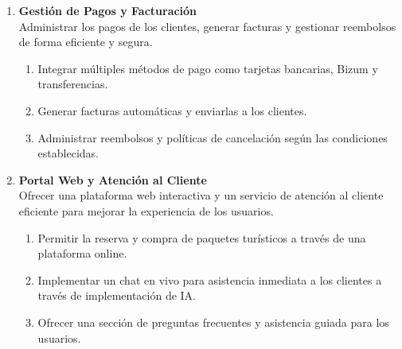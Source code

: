 \begin{enumerate}[label=\textcolor{red}{RF-\arabic*.}]
    \item \textbf{Gestión de Pagos y Facturación}\\
    Administrar los pagos de los clientes, generar facturas y gestionar reembolsos de forma eficiente y segura. 
    \begin{enumerate}[label=\textcolor{red}{RF-3.\arabic*}]
        \item Integrar múltiples métodos de pago como tarjetas bancarias, Bizum y transferencias.
        \item Generar facturas automáticas y enviarlas a los clientes.
        \item Administrar reembolsos y políticas de cancelación según las condiciones establecidas.
    \end{enumerate}

    \item \textbf{Portal Web y Atención al Cliente}\\
    Ofrecer una plataforma web interactiva y un servicio de atención al cliente eficiente para mejorar la experiencia de los usuarios.
    \begin{enumerate}[label=\textcolor{red}{RF-4.\arabic*}]
        \item Permitir la reserva y compra de paquetes turísticos a través de una plataforma online.
        \item Implementar un chat en vivo para asistencia inmediata a los clientes a través de implementación de IA.
        \item Ofrecer una sección de preguntas frecuentes y asistencia guiada para los usuarios.
    \end{enumerate}
\end{enumerate}

